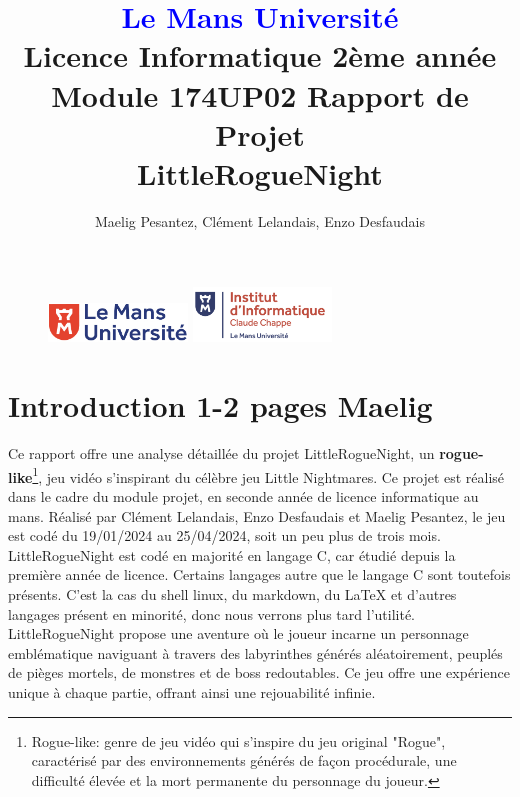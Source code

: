 \documentclass[10pt]{article}
\begin{document}
\begin{figure}
\includegraphics[width=3.7cm]{logolemansU.png}
\hspace{160pt}
\includegraphics[width=3.7cm]{logo_IC2.png}
\end{figure}

\title{\textbf{\textcolor{blue}{Le Mans Université}}\\Licence Informatique 2ème année\\Module 174UP02 Rapport de Projet\\\textbf{LittleRogueNight}}
\author{Maelig Pesantez, Clément Lelandais, Enzo Desfaudais}
\maketitle

\newpage
\tableofcontents

\newpage

\section{Introduction 1-2 pages Maelig}
Ce rapport offre une analyse détaillée du projet LittleRogueNight, un \textbf{rogue-like}\footnote{Rogue-like: genre de jeu vidéo qui s'inspire du jeu original 
"Rogue", caractérisé par des environnements générés de façon procédurale, une difficulté élevée et la mort permanente du personnage du joueur.}, 
jeu vidéo s'inspirant du célèbre jeu Little Nightmares. 
Ce projet est réalisé dans le cadre du module projet, en seconde année de licence informatique au mans.
Réalisé par Clément Lelandais, Enzo Desfaudais et Maelig Pesantez, le jeu est codé du 19/01/2024 au 25/04/2024, soit un peu plus de trois mois.
LittleRogueNight est codé en majorité en langage C, car étudié depuis la première année de licence. Certains langages autre que le langage C sont toutefois présents.
C'est la cas du shell linux, du markdown, du LaTeX et d'autres langages présent en minorité, donc nous verrons plus tard l'utilité.
LittleRogueNight propose une aventure où le joueur incarne un personnage emblématique naviguant à travers des labyrinthes générés aléatoirement, 
peuplés de pièges mortels, de monstres et de boss redoutables. 
Ce jeu offre une expérience unique à chaque partie, offrant ainsi une rejouabilité infinie.\\
\end{document}
